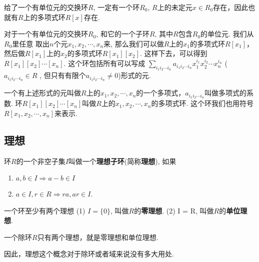 \begin{Theorem}
给了一个有单位元的交换环$R$, 一定有一个环$R_0$, $R$上的未定元$x \in R_0$存在，因此也就有$R$上的多项式环$R[x]$存在.
\end{Theorem}

\begin{Note}
对于一个有单位元的交换环$R_0$, 和它的一个子环$R$, 其中$R$包含$R_0$的单位元. 我们从$R_0$里任意
取出$n$个元$x_1, x_2, \cdots, x_n$来, 那么我们可以做$R$上的$x_1$的多项式环$R[x_1]$，然后做$R[x_1]$上的$x_2$的多项式环$R[x_1][x_2]$. 这样下去，可以得到$R[x_1][x_2]\cdots[x_n]$. 这个环包括所有可以写成 
$\displaystyle \sum_{i_1 i_2 \cdots i_n} a_{i_1 i_2 \cdots i_n} x_1^{i_1} x_2^{i_2} \cdots x_n^{i_n}$ ($a_{i_1 i_2 \cdots i_n} \in R$
, 但只有有限个$a_{i_1 i_2 \cdots i_n} \neq 0$)形式的元.
\end{Note}

\begin{Definition}
一个有上述形式的元叫做$R$上的$x_1, x_2, \cdots, x_n$的一个多项式，$a_{i_1 i_2 \cdots i_n}$叫做多项式的系数. 环$R[x_1][x_2]\cdots[x_n]$叫做$R$上的$x_1, x_2, \cdots, x_n$的多项式环. 这个环我们也用符号$R[x_1, x_2, \cdots, x_n]$来表示.
\end{Definition}

\subsection{理想}

\begin{Definition}[理想]
环$R$的一个非空子集$I$叫做一个\textbf{理想子环}(简称\textbf{理想}), 如果
\begin{enumerate}
	\item $a, b \in I \Rightarrow a - b \in I$
	\item $a \in I, r \in R \Rightarrow ra, ar \in I$.
\end{enumerate}
\end{Definition}

\begin{Proposition}
一个环至少有两个理想 (1) $I = \{\mathfrak{0}\}$, 叫做$R$的\textbf{零理想}.
(2) I = R, 叫做$R$的\textbf{单位理想}.
\end{Proposition}

\begin{Theorem}
一个除环$R$只有两个理想，就是零理想和单位理想.
\end{Theorem}

\begin{Note}
因此，理想这个概念对于除环或者域来说没有多大用处.
\end{Note}


